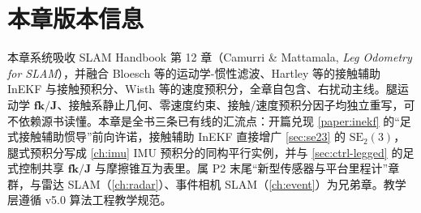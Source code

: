 \section*{本章版本信息}
\begin{finenote}
本章系统吸收 SLAM Handbook 第 12 章（Camurri \& Mattamala, \emph{Leg Odometry for SLAM}），并融合 Bloesch 等的运动学-惯性滤波\cite{bloesch2013state}、Hartley 等的接触辅助 InEKF 与接触预积分\cite{hartley2020contact,hartley2018legged}、Wisth 等的速度预积分\cite{wisth2023vilens}，全章自包含、右扰动主线。腿运动学 $\mathbf{fk}/\mathbf{J}$、接触系静止几何、零速度约束、接触/速度预积分因子均独立重写，可不依赖源书读懂。本章是全书三条已有线的汇流点：开篇兑现 \cref{paper:inekf} 的“足式接触辅助惯导”前向许诺，接触辅助 InEKF 直接增广 \cref{sec:se23} 的 $\mathrm{SE}_2(3)$，腿式预积分写成 \cref{ch:imu} IMU 预积分的同构平行实例，并与 \cref{sec:ctrl-legged} 的足式控制共享 $\mathbf{fk}/\mathbf{J}$ 与摩擦锥互为表里。属 P2 末尾“新型传感器与平台里程计”章群，与雷达 SLAM（\cref{ch:radar}）、事件相机 SLAM（\cref{ch:event}）为兄弟章。教学层遵循 v5.0 算法工程教学规范。
\end{finenote}
